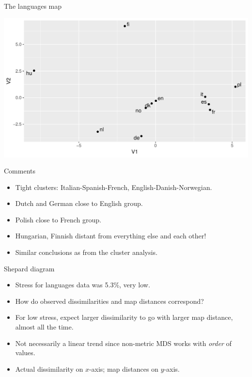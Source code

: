 \documentclass[unknownkeysallowed]{beamer}\usepackage[]{graphicx}\usepackage[]{color}
\makeatletter
\def\maxwidth{ %
  \ifdim\Gin@nat@width>\linewidth
    \linewidth
  \else
    \Gin@nat@width
  \fi
}
\newenvironment{knitrout}{}{} %
\makeatother
\begin{document}
\begin{frame}[fragile]{The languages map}

\begin{knitrout}
\color{fgcolor}
\includegraphics[width=\maxwidth]{figure/padova-1} 

\end{knitrout}
  
  
  
\end{frame}

\begin{frame}[fragile]{Comments}
  
  \begin{itemize}
  \item Tight clusters: Italian-Spanish-French, English-Danish-Norwegian.
  \item Dutch and German close to English group.
  \item Polish close to French group.
  \item Hungarian, Finnish distant from everything else and each other!
  \item Similar conclusions as from the cluster analysis.
  \end{itemize}
  
\end{frame}

\begin{frame}[fragile]{Shepard diagram}
  
  \begin{itemize}
  \item Stress for languages data was 5.3\%, very low.
  \item How do observed dissimilarities and map distances correspond?
  \item For low stress, expect larger dissimilarity to go with larger
    map distance, almost all the time.
  \item Not necessarily a linear trend since non-metric MDS works with
    \emph{order} of values.
  \item Actual dissimilarity on $x$-axis; map distances on $y$-axis.
  \end{itemize}
  
\end{frame}
\end{document}
